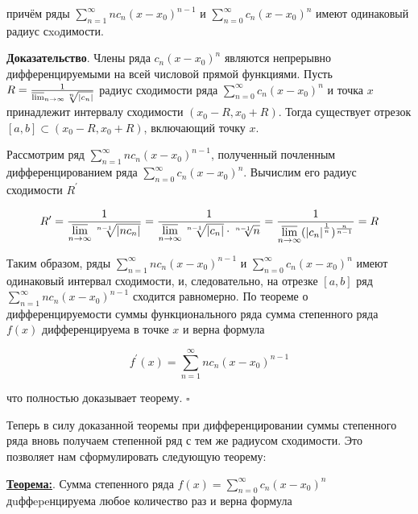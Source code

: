 \documentclass[a4paper,12pt]{article} %
\begin{document}
причём ряды $\sum\limits_{n=1}^{\infty} n c_{n}\left(x-x_{0}\right)^{n-1}$ и $\sum\limits_{n=0}^{\infty} c_{n}\left(x-x_{0}\right)^{n}$ имеют одинаковый радиус сxoдимости.

\textbf{Доказательство}. Члены ряда $c_{n}\left(x-x_{0}\right)^{n}$ являются непрерывно дифференцируемыми на всей числовой прямой функциями. Пусть $R=\frac{1}{\varlimsup_{n \rightarrow \infty} \sqrt[n]{\left|c_{n}\right|}}$ радиус сходимости ряда $\sum\limits_{n=0}^{\infty} c_{n}\left(x-x_{0}\right)^{n}$ и точка $x$ принадлежит интервалу сходимости $\left(x_{0}-R, x_{0}+R\right) .$ Тогда существует отрезок $[a, b] \subset\left(x_{0}-R, x_{0}+R\right)$, включающий точку $x .$

Рассмотрим ряд $\sum\limits_{n=1}^{\infty} n c_{n}\left(x-x_{0}\right)^{n-1}$, полученный почленным дифференцированием ряда $\sum\limits_{n=0}^{\infty} c_{n}\left(x-x_{0}\right)^{n} .$ Вычислим его радиус сходимости $R^{\prime}$

\begin{equation*}
R^{\prime}=\frac{1}{\varlimsup \limits_{n \rightarrow \infty} \sqrt[n-1]{\left|n c_{n}\right|}} = \frac{1}{\varlimsup \limits_{n \rightarrow \infty} \sqrt[n-1]{\left|c_{n}\right|}\cdot \sqrt[n-1]{n}} = \frac{1}{\varlimsup \limits_{n \rightarrow \infty}(\left|c_{n}\right|^{\frac{1}{n}})^{\frac{n}{n-1}}}=R
\end{equation*}

Таким образом, ряды $\sum\limits_{n=1}^{\infty} n c_{n}\left(x-x_{0}\right)^{n-1}$ и $\sum\limits_{n=0}^{\infty} c_{n}\left(x-x_{0}\right)^{n}$ имеют одинаковый интервал сходимости, и, следовательно, на отрезке $[a, b]$ ряд $\sum\limits_{n=1}^{\infty} n c_{n}\left(x-x_{0}\right)^{n-1}$ сходится равномерно. По теореме о дифференцируемости суммы функционального ряда сумма степенного ряда $f(x)$ дифференцируема в точке $x$ и верна формула

\begin{equation*}
f^{\prime}(x)=\sum\limits_{n=1}^{\infty} n c_{n}\left(x-x_{0}\right)^{n-1}
\end{equation*}

что полностью доказывает теорему. $\square$

Теперь в силу доказанной теоремы при дифференцировании суммы степенного ряда вновь получаем степенной ряд с тем же радиусом сходимости. Это позволяет нам сформулировать
следующую теорему:

\underline{\textbf{Теорема:}}. Сумма степенного ряда $f(x)=\sum\limits_{n=0}^{\infty} c_{n}\left(x-x_{0}\right)^{n}$ дuффepeнцируема любое количество раз и верна формула
\end{document}

